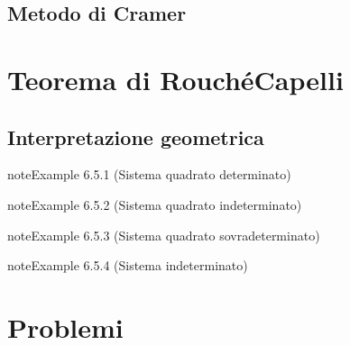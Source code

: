 \documentclass[letterpaper,10pt,italian]{jupyterBook}
\begin{document}
\subsection{Metodo di Cramer}
\label{\detokenize{ch/algebra/linear-algebra:metodo-di-cramer}}\label{\detokenize{ch/algebra/linear-algebra:math-hs-algebra-linear-linear-system-sol-cramer}}
\sphinxAtStartPar
{} 


\section{Teorema di Rouché\sphinxhyphen{}Capelli}
\label{\detokenize{ch/algebra/linear-algebra:teorema-di-rouche-capelli}}\label{\detokenize{ch/algebra/linear-algebra:math-hs-algebra-linear-rouche-capelli}}

\subsection{Interpretazione geometrica}
\label{\detokenize{ch/algebra/linear-algebra:interpretazione-geometrica}}\label{\detokenize{ch/algebra/linear-algebra:math-hs-algebra-linear-rouche-capelli-geometry}}\label{ch/algebra/linear-algebra:linsys-geo-1}
\begin{sphinxadmonition}{note}{Example 6.5.1 (Sistema quadrato determinato)}


\end{sphinxadmonition}
\label{ch/algebra/linear-algebra:linsys-geo-2}
\begin{sphinxadmonition}{note}{Example 6.5.2 (Sistema quadrato indeterminato)}


\end{sphinxadmonition}
\label{ch/algebra/linear-algebra:linsys-geo-3}
\begin{sphinxadmonition}{note}{Example 6.5.3 (Sistema quadrato sovradeterminato)}


\end{sphinxadmonition}
\label{ch/algebra/linear-algebra:linsys-geo-4}
\begin{sphinxadmonition}{note}{Example 6.5.4 (Sistema indeterminato)}


\end{sphinxadmonition}


\section{Problemi}
\label{\detokenize{ch/algebra/linear-algebra:problemi}}\label{\detokenize{ch/algebra/linear-algebra:math-hs-algebra-linear-problems}}
\end{document}

